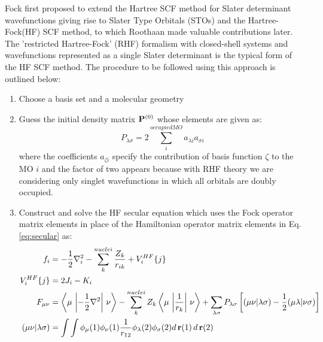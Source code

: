            Fock first proposed to extend the Hartree SCF method for Slater determinant wavefunctions giving rise to Slater Type Orbitals (STOs) and the Hartree-Fock(HF) SCF method$\allowbreak$, to which Roothaan \cite{Roothaan1951} made valuable contributions later. The 'restricted Hartree-Fock' (RHF) formalism with closed-shell systems and wavefunctions represented as a single Slater determinant is the typical form of the HF SCF method. The procedure to be followed using this approach is outlined below:
            \begin{enumerate}
                \item Choose a basis set and a molecular geometry
                \item Guess the initial density matrix ${\mathbf {P}}^{(0)}$ whose elements are given as:
                    \begin{equation}\label{eq:density matrix elements}
                        P_{\lambda \sigma} = 2 \displaystyle\sum_i^{occupied MO} a_{\lambda i} a_{\sigma i}
                    \end{equation}
                    where the coefficients $a_{\zeta i}$ specify the contribution of basis function $\zeta$ to the MO $i$ and the factor of two appears because with RHF theory we are considering only singlet wavefunctions in which all orbitals are doubly occupied.
                \item Construct and solve the HF secular equation which uses the Fock operator matrix elements in place of the Hamiltonian operator matrix elements in Eq. \eqref{eq:secular} as:
                    \begin{equation}\label{eq:one electron Fock matrix elements}
                        \begin{aligned}
                            f_i &= -\frac{1}{2} \nabla^2_i - \displaystyle\sum_k^{nuclei} \frac{Z_k}{r_{ik}} + V_i^{HF} \{j\}\\
                            V_i^{HF} \{j\} &= 2 J_i - K_i\\
                            F_{\mu \nu} &= \left< \mu \,\left| -\frac{1}{2} \nabla^2 \right|\,\nu \right> - \displaystyle\sum_k^{nuclei} Z_k \left< \mu \,\left| \frac{1}{r_k} \right| \, \nu \right> + \displaystyle\sum_{\lambda \sigma} P_{\lambda \sigma} \left[ (\mu \nu | \lambda \sigma) - \frac{1}{2} (\mu \lambda | \nu \sigma) \right]\\
                            (\mu \nu | \lambda \sigma) &= \displaystyle\int \int \phi_\mu (1) \phi_\nu(1) \frac{1}{r_{12}}\phi_\lambda (2) \phi_\sigma (2) d\,\mbf{r}(1)\,d\,\mbf{r}(2)

\end{aligned}
\end{equation}
\end{enumerate}
